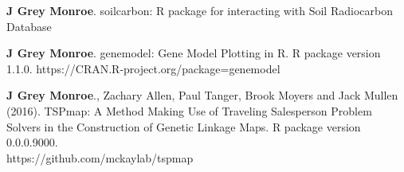\documentclass[12pt,english]{article}
\begin{document}
\begin{hangparas}{.5in}{1}
\hspace{1em}\textbf{J Grey Monroe}. soilcarbon: R package for interacting with Soil Radiocarbon Database\vspace{0.5ex}\par
\hspace{1em}\textbf{J Grey Monroe}. genemodel: Gene Model Plotting in R. R package version 1.1.0.
  https://CRAN.R-project.org/package=genemodel
\vspace{0.5ex}\par
\hspace{1em}\textbf{J Grey Monroe}., Zachary Allen, Paul Tanger, Brook Moyers and Jack Mullen (2016). TSPmap: A Method Making Use of Traveling Salesperson Problem Solvers in the Construction of Genetic Linkage Maps. R package version 0.0.0.9000. \\https://github.com/mckaylab/tspmap

\end{hangparas}
\end{document}
